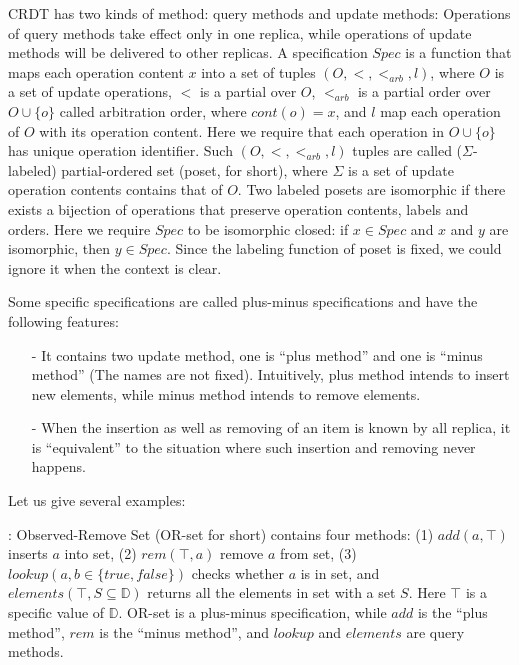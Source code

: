 CRDT has two kinds of method: query methods and update methods: Operations of query methods take effect only in one replica, while operations of update methods will be delivered to other replicas. A specification $Spec$ is a function that maps each operation content $x$ into a set of tuples $(O,<,<_{\textit{arb}},l)$, where {\color {red}$O$ is a set of update operations}, $<$ is a partial over $O$, {\color {red}$<_{\textit{arb}}$ is a partial order over $O \cup \{ o \}$ called arbitration order, where $cont(o)=x$}, and $l$ map each operation of $O$ with its operation content. Here we require that each operation in $O \cup \{ o \}$ has unique operation identifier. Such $(O,<,<_{\textit{arb}},l)$ tuples are called ($\Sigma$-labeled) partial-ordered set (poset, for short), where $\Sigma$ is a set of update operation contents contains that of $O$. Two labeled posets are isomorphic if there exists a bijection of operations that preserve operation contents, labels and orders. Here we require $Spec$ to be isomorphic closed: if $x \in Spec$ and $x$ and $y$ are isomorphic, then $y \in Spec$. Since the labeling function of poset is fixed, we could ignore it when the context is clear. 


Some specific specifications are called plus-minus specifications and have the following features:

\begin{itemize}
\setlength{\itemsep}{0.5pt}
\item[-] It contains two update method, one is ``plus method'' and one is ``minus method'' (The names are not fixed). Intuitively, plus method intends to insert new elements, while minus method intends to remove elements.

\item[-] When the insertion as well as removing of an item is known by all replica, it is ``equivalent'' to the situation where such insertion and removing never happens.
\end{itemize}

Let us give several examples:

: Observed-Remove Set (OR-set for short) \cite{Shapiro:2011,Bieniusa:2012} contains four methods: (1) $add(a,\top)$ inserts $a$ into set, (2) $rem(\top,a)$ remove $a$ from set, (3) $lookup(a, b \in \{ \textit{true}, \textit{false} \})$ checks whether $a$ is in set, and $elements(\top, S \subseteq \mathbb{D})$ returns all the elements in set with a set $S$. Here $\top$ is a specific value of $\mathbb{D}$. OR-set is a plus-minus specification, while $add$ is the ``plus method'', $rem$ is the ``minus method'', and $lookup$ and $elements$ are query methods.

